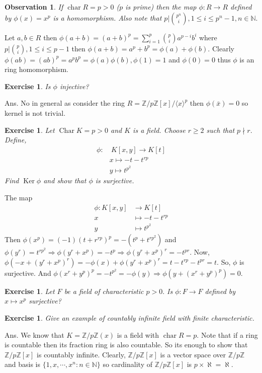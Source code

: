\documentclass[11pt]{amsart}
\newtheorem{ex}[theorem]{Exercise}
\newtheorem{obs}[theorem]{Observation}
\newcommand{\ZZ}{\mathbb Z}
\newcommand{\NN}{\mathbb N}
\newcommand{\gen}[1]{\langle#1\rangle}
\DeclareMathOperator{\ch}{\text{char}}
\begin{document}
\begin{obs}
If $\ch R=p>0$ ($p$ is prime) then the map $\phi: R\to R$ defined by $\phi(x)=x^p$ is a homomorphism. Also note that $p|\binom{p^n}{i},1\leq i\leq p^n-1,n\in {\NN}.$
\end{obs}
\proof Let $a,b\in R$ then $\phi(a+b)=(a+b)^p=\displaystyle\sum_{i=1}^p \binom{p}{i} a^{p-i}b^i$ where $p|\binom{p}{i},1\leq i\leq p-1$ then $\phi(a+b)=a^p+b^p=\phi(a)+\phi(b).$ Clearly $\phi(ab)=(ab)^p=a^pb^p=\phi(a)\phi(b),\phi(1)=1$ and $\phi(0)=0$ thus $\phi$ is an ring homomorphism.
\begin{ex}
Is $\phi$ injective?
\end{ex}
Ans. No in general as consider the ring $R={\ZZ}/p{\ZZ}[x]/\gen{x}^p$ then $\phi(\bar{x})=0$ so kernel is not trivial.
\begin{ex}
Let $\operatorname{Char}K=p>0$ and $K$ is a field. Choose $r\geq 2$ such that $p\nmid r.$ Define, \begin{align*}
\phi:&~K[x,y]\to K[t]\\
&x\mapsto -t-t^{rp}\\
&y\mapsto t^{p^2}
\end{align*}
Find $\operatorname{Ker}\phi$ and show that $\phi$ is surjective.
\end{ex}
\proof The map \begin{align*}
\phi:K[x,y]&\to K[t]\\
x&\mapsto -t-t^{rp}\\
y&\mapsto t^{p^2}
\end{align*}
Then $\phi(x^p)=(-1)(t+r^{rp})^p=-(t^p+t^{rp^2})$ and $\phi(y^r)=t^{rp^2} \Rightarrow \phi(y^r+x^p)=-t^p \Rightarrow \phi(y^r+x^p)^r=-t^{pr}.$ Now, $\phi(-x+(y^r+x^p)^r)=-\phi(x)+\phi(y^r+x^p)^r=t-t^{rp}-t^{pr}=t.$ So, $\phi$ is surjective. And $\phi(x^r+y^p)^p=-t^{p^2}=-\phi(y) \Rightarrow \phi(y+(x^r+y^p)^p)=0.$




\begin{ex}
Let $F$ be a field of characteristic $p>0.$ Is $ \phi:F\to F$ defined by $x\mapsto x^p$ surjective?
\end{ex}
\begin{ex}
Give an example of countably infinite field with finite characteristic.
\end{ex}
Ans. We know that $K={\ZZ}/p{\ZZ}(x)$ is a field with $\ch R=p.$ Note that if a ring is countable then its fraction ring is also countable. So its enough to show that ${\ZZ}/p{\ZZ}[x]$ is countably infinite. Clearly, ${\ZZ}/p{\ZZ}[x]$ is a vector space over ${\ZZ}/p{\ZZ}$ and basis is $\{1,x,\cdots,x^n:n\in {\NN}\}$ so cardinality of ${\ZZ}/p{\ZZ}[x]$ is $p\times \aleph=\aleph.$ 
\end{document}
